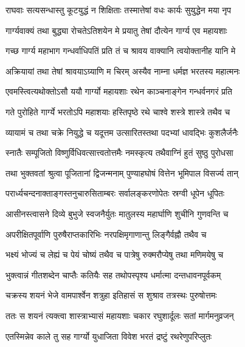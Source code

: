 
\twolineshloka
{राघवाः सत्यसन्धास्तु कूटयुद्धं न शिक्षिताः}
{तस्मात्तेषां वधः कार्यः सुयुद्धेन मया नृप}%

\twolineshloka
{गार्ग्यवाक्यं तथा बुद्ध्या रोचतेऽतिशयेन मे}
{प्रयातु तेषां दौत्येन गार्ग्य एव महायशाः}%


\twolineshloka
{गच्छ गार्ग्य महाभाग गन्धर्वाधिपतिं प्रति}
{तं च श्रावय वाक्यानि त्वयोक्तानीह यानि मे}%

\twolineshloka
{अक्रियायां तथा तेषां श्रावयाऽग्र्याणि म चिरम्}
{अस्यैव नाम्ना धर्मज्ञ भरतस्य महात्मनः} %


\twolineshloka
{एवमस्त्वित्यथोक्तोऽसौ ययौ गार्ग्यो महायशाः}
{रथेन काञ्चनाङ्गेन गन्धर्वनगरं प्रति}%

\twolineshloka
{गते पुरोहिते गार्ग्ये भरतोऽपि महाशयाः}
{हस्तिपृष्ठे रथे चाश्वे शस्त्रे शास्त्रे तथैव च}%

\twolineshloka
{व्यायामं च तथा चक्रे नियुद्धे च यदूत्तम}
{उत्सारितस्तथा पदभ्यां धावद्भिः कुशलैर्जनैः}%

\twolineshloka
{स्नातैः सम्पूजितो विष्णुर्विधिवत्सात्त्वतोत्तमैः}
{नमस्कृत्य तथैवाग्निं हुतं सुष्ठु पुरोधसा}%

\twolineshloka
{तथा भुक्तवतां श्रुत्वा पूजितानां द्विजन्मनाम्}
{पुण्याहघोषं वित्तेन भूमिपाल विसर्ज्य तान्}%

\twolineshloka
{परार्ध्यचन्दनाक्ताङ्गस्तनुचारुसिताम्बरः}
{सर्वालङ्करणोपेतः स्रग्वी धूपेन धूपितः}%

\twolineshloka
{आसीनस्त्वासने दिव्ये बुभुजे स्वजनैर्युतः}
{मातुलस्य महार्घाणि शुचीनि गुणवन्ति च}%

\twolineshloka
{अपरीक्षितपूर्वाणि पुरुषैराप्तकारिभिः}
{नरपक्षिमृगाणान्तु लिङ्गैर्वह्नौ तथैव च}%

\twolineshloka
{भक्ष्यं भोज्यं च लेह्यं च पेयं चोष्यं तथैव च}
{पात्रेषु रुक्मरौप्येषु तथा मणिमयेषु च}%

\twolineshloka
{भुक्त्वान्नं गीतशब्देन चाप्तैः कतियैः सह}
{तथोपस्पृश्य धर्मात्मा दन्तधावनपूर्वकम्} %

\twolineshloka
{चक्रस्य शयनं भेजे वामपार्श्वेन शत्रुहा}
{इतिहासं स शुश्राव तत्रस्थः पुरुषोत्तमः}%

\twolineshloka
{ततः स शयनं त्यक्त्वा शास्त्राभ्यासं महायशाः}
{चकार रघुशार्दूलः सतां मार्गमनुव्रजन्}%

\twolineshloka
{एतस्मिन्नेव काले तु सह गार्ग्यो युधाजिता}
{विवेश भरतं द्रष्टुं रथरेणुपरिप्लुतः}%

